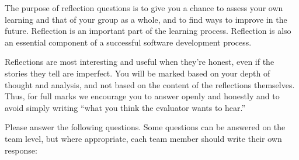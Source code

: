 The purpose of reflection questions is to give you a chance to assess your own
learning and that of your group as a whole, and to find ways to improve in the
future. Reflection is an important part of the learning process.  Reflection is
also an essential component of a successful software development process.

Reflections are most interesting and useful when they're honest, even if the
stories they tell are imperfect. You will be marked based on your depth of
thought and analysis, and not based on the content of the reflections
themselves. Thus, for full marks we encourage you to answer openly and honestly
and to avoid simply writing ``what you think the evaluator wants to hear.''

Please answer the following questions.  Some questions can be answered on the
team level, but where appropriate, each team member should write their own
response:
